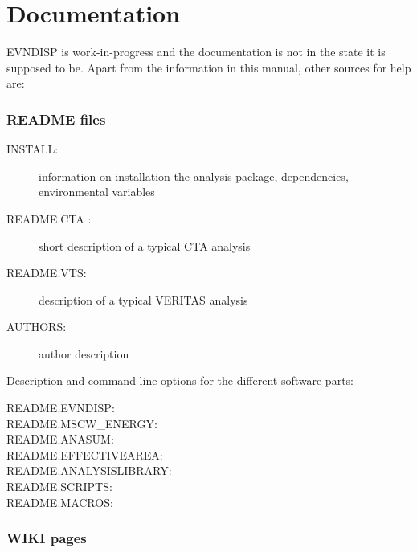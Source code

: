 \documentclass[titlepage,a4paper,twoside,11pt]{report}
\newcommand{\clearemptydoublepage}{\newpage{\pagestyle{empty}\cleardoublepage}}
\begin{document}




\thispagestyle{empty}


\setcounter{page}{1}
\tableofcontents
\clearemptydoublepage



\chapter{Documentation}

EVNDISP is work-in-progress and the documentation is not in the state it is supposed to be. 
Apart from the information in this manual, other sources for help are:

\subsection*{README files}

\begin{description}
\item[INSTALL:]   information on installation the analysis package, dependencies, environmental variables
\item[README.CTA :]  short description of a typical CTA analysis
\item[README.VTS:]      description of a typical VERITAS analysis
\item[AUTHORS:]		author description
\end{description}

\noindent Description and command line options for the different software parts:

\begin{description}
\item[README.EVNDISP:]
\item[README.MSCW\_ENERGY:]
\item[README.ANASUM:]
\item[README.EFFECTIVEAREA:]
\item[README.ANALYSISLIBRARY:]
\item[README.SCRIPTS:]
\item[README.MACROS:]
\end{description}

\subsection*{WIKI pages}
\end{document}
